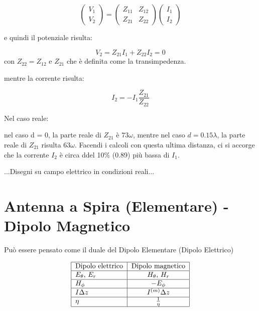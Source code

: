 \begin{equation}
\left( \begin{array}{c}
V_1 \\
V_2 \end{array} \right)
=
\left( \begin{array}{cc}
Z_{11} & Z_{12} \\
Z_{21} & Z_{22} \end{array} \right)
\left( \begin{array}{cc}
I_1 \\
I_2 \end{array} \right)
\end{equation}

e quindi il potenziale risulta:

\begin{equation}
V_2 = Z_{21}I_1+Z_{22}I_2 = 0
\end{equation}
con $Z_{22} = Z_{12}$ e $Z_{21}$ che è definita come la transimpedenza.

mentre la corrente risulta:

\begin{equation}
I_2 = -I_1 \frac{Z_{21}}{Z_{22}}
\end{equation}

Nel caso reale:

nel caso d = 0, la parte reale di $Z_{21}$ è $73\omega$, mentre nel caso $d = 0.15 \lambda$, la parte reale di $Z_{21}$ risulta $63\omega$. Facendi i calcoli con questa ultima distanza, ci si accorge che la corrente $I_{2}$ è circa ddel 10\% (0.89) più bassa di $I_{1}$.

...Disegni su campo elettrico in condizioni reali...

\clearpage

\section{Antenna a Spira (Elementare) - Dipolo Magnetico}

Può essere pensato come il duale del Dipolo Elementare (Dipolo Elettrico)

\begin{equation}
\begin{tabular}{|l|c|r|}
\hline
Dipolo elettrico & Dipolo magnetico \\
\hline
$E_{\theta}$, $E_{r}$ & $H_{\theta}$, $H_{r}$ \\
\hline
$H_{\phi}$ & $-E_{\phi}$ \\
\hline
$I \Delta z$ & $I^{(m)} \Delta z$ \\
\hline
$\eta$ & $\frac{1}{\eta}$ \\
\hline
\end{tabular}
\end{equation}

